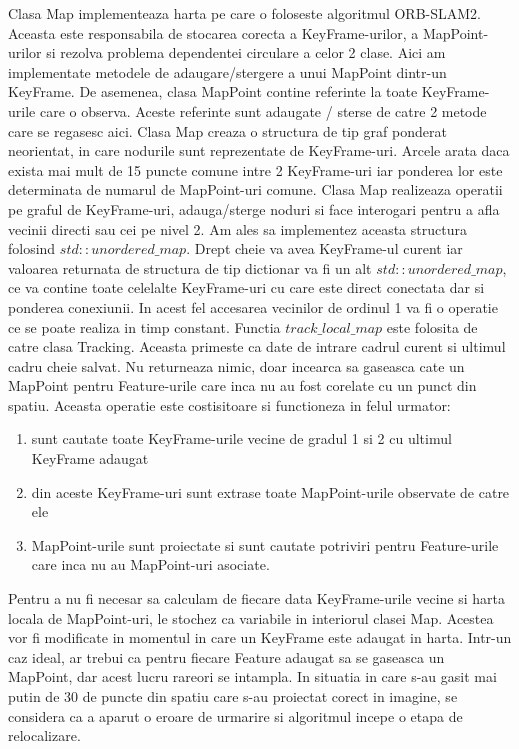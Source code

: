 \documentclass[12pt,a4paper]{report}
\begin{document}
Clasa Map implementeaza harta pe care o foloseste algoritmul ORB-SLAM2. Aceasta este responsabila
de stocarea corecta a KeyFrame-urilor, a MapPoint-urilor si rezolva problema dependentei circulare
a celor 2 clase. Aici am implementate metodele de adaugare/stergere a unui MapPoint dintr-un KeyFrame.
De asemenea, clasa MapPoint contine referinte la toate KeyFrame-urile care o observa. Aceste 
referinte sunt adaugate / sterse de catre 2 metode care se regasesc aici. Clasa Map creaza o 
structura de tip graf ponderat neorientat, in care nodurile sunt reprezentate de KeyFrame-uri. 
Arcele arata daca exista mai mult de 15 puncte comune intre 2 KeyFrame-uri iar ponderea lor este 
determinata de numarul de MapPoint-uri comune. Clasa Map realizeaza operatii pe graful de KeyFrame-uri,
adauga/sterge noduri si face interogari pentru a afla vecinii directi sau cei pe nivel 2. Am ales 
sa implementez aceasta structura folosind $ std::unordered\_map $. Drept cheie va avea KeyFrame-ul 
curent iar valoarea returnata de structura de tip dictionar va fi un alt $ std::unordered\_map $, 
ce va contine toate celelalte KeyFrame-uri cu care este direct conectata dar si ponderea conexiunii.
In acest fel accesarea vecinilor de ordinul 1 va fi o operatie ce se poate realiza in timp constant.
Functia $ track\_local\_map $ este folosita de catre clasa Tracking. Aceasta primeste ca date 
de intrare cadrul curent si ultimul cadru cheie salvat. Nu returneaza nimic, doar incearca 
sa gaseasca cate un MapPoint pentru Feature-urile care inca nu au fost corelate cu un punct 
din spatiu. Aceasta operatie este costisitoare si functioneza in felul urmator:
\begin{enumerate}
    \item sunt cautate toate KeyFrame-urile vecine de gradul 1 si 2 cu ultimul KeyFrame adaugat
    \item din aceste KeyFrame-uri sunt extrase toate MapPoint-urile observate de catre ele 
    \item MapPoint-urile sunt proiectate si sunt cautate potriviri pentru Feature-urile
care inca nu au MapPoint-uri asociate.
\end{enumerate}
Pentru a nu fi necesar sa calculam de fiecare data KeyFrame-urile vecine si  
harta locala de MapPoint-uri, le stochez ca variabile in interiorul clasei Map. Acestea vor 
fi modificate in momentul in care un KeyFrame este adaugat in harta. Intr-un caz ideal, ar 
trebui ca pentru fiecare Feature adaugat sa se gaseasca un MapPoint, dar acest lucru rareori 
se intampla. In situatia in care s-au gasit mai putin de 30 de puncte din spatiu care s-au 
proiectat corect in imagine, se considera ca a aparut o eroare de urmarire si algoritmul incepe o
etapa de relocalizare. \\
\end{document}
